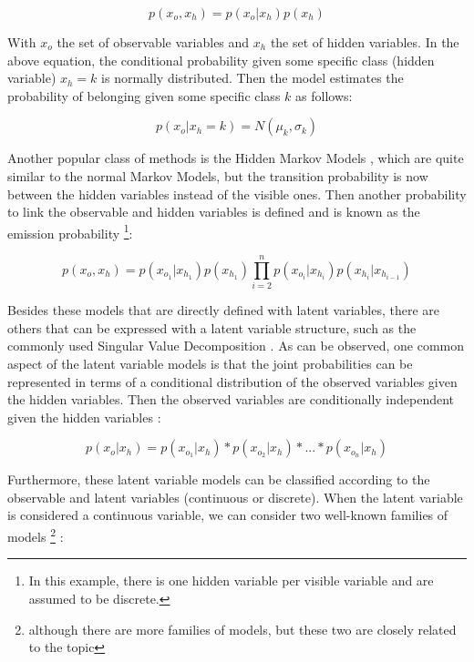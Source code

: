 \begin{equation}
\label{eq:chap2_1}
p(x_{o}, x_{h}) = p(x_{o} | x_{h}) p(x_{h})
\end{equation}

With $x_{o}$ the set of observable variables and $x_{h}$ the set of hidden variables. In the above equation, the conditional probability given some specific class (hidden variable) $x_{h} = k$ is normally distributed. Then the model estimates the probability of belonging given some specific class $k$ as follows:

\begin{equation}
\label{eq:chap2_2}
p(x_{o} | x_{h} = k) = N(\mu_k, \sigma_k)
\end{equation}

Another popular class of methods is the Hidden Markov Models \cite{bishop2006pattern}, which are quite similar to the normal Markov Models, but the transition probability is now between the hidden variables instead of the visible ones. Then another probability to link the observable and hidden variables is defined and is known as the emission probability \footnote{In this example, there is one hidden variable per visible variable and are assumed to be discrete.}:

\begin{equation}
p(x_{o}, x_{h}) = p(x_{o_1} | x_{h_1}) p(x_{h_1}) \prod_{i =2}^n p(x_{o_i} | x_{h_i}) p(x_{h_i} | x_{h_{i-1}})
\end{equation}

Besides these models that are directly defined with latent variables, there are others that can be expressed with a latent variable structure, such as the commonly used Singular Value Decomposition \cite{friedman2009elements}. As can be observed, one common aspect of the latent variable models is that the joint probabilities can be represented in terms of a conditional distribution of the observed variables given the hidden variables. Then the observed variables are conditionally independent given the hidden variables \cite{everett2013introduction}:

\begin{equation}
p(x_{o} | x_{h}) = p(x_{o_1}| x_{h})*p(x_{o_2}| x_{h}) * ...*p(x_{o_n}| x_{h})
\end{equation}

Furthermore, these latent variable models can be classified according to the observable and latent variables (continuous or discrete). When the latent variable is considered a continuous variable, we can consider two well-known families of models \footnote{although there are more families of models, but these two are closely related to the topic} \cite{everett2013introduction}:

